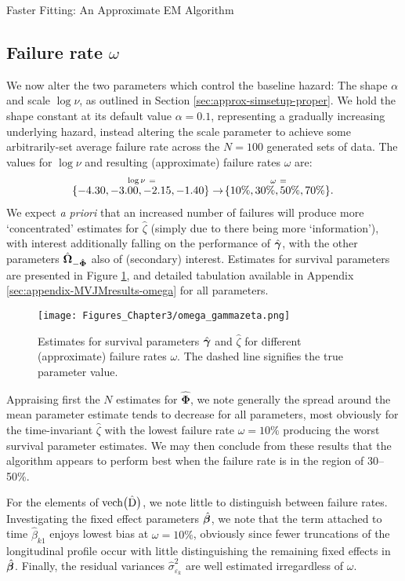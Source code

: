 \begin{chapter}{\label{cha:approx}Faster Fitting: An Approximate EM Algorithm}
  \subsection{Failure rate \texorpdfstring{$\omega$}{omega}}\label{sec:approx-sims-omega}
  We now alter the two parameters which control the baseline hazard: The shape $\alpha$ and scale $\log\nu$, as outlined in Section \ref{sec:approx-simsetup-proper}. We hold the shape constant at its default value $\alpha=0.1$, representing a gradually increasing underlying hazard, instead altering the scale parameter to achieve some arbitrarily-set average failure rate across the $N=100$ generated sets of data. The values for $\log\nu$ and resulting (approximate) failure rates $\omega$ are:
  \begin{align*}
      \overset{\log\nu\ =}{\!\left\{-4.30, -3.00, -2.15, -1.40\right\}}\rightarrow\overset{\omega\ =}{\!\left\{10\%,30\%,50\%,70\%\right\}}.
  \end{align*}
  We expect \textit{a priori} that an increased number of failures will produce more `concentrated' estimates for $\hat{\zeta}$ (simply due to there being more `information'), with interest additionally falling on the performance of $\hat{\bm{\gamma}}$, with the other parameters $\hat{\bm{\Omega}}_{-\hat{\bm{\Phi}}}$ also of (secondary) interest. Estimates for survival parameters are presented in Figure \ref{fig:approx-sims-omega}, and detailed tabulation available in Appendix \ref{sec:appendix-MVJMresults-omega} for all parameters.

  \begin{figure}[t]
      \centering
      \texttt{[image: Figures\_Chapter3/omega\_gammazeta.png]}
      \caption{Estimates for survival parameters $\hat{\bm{\gamma}}$ and $\hat{\zeta}$ for different (approximate) failure rates $\omega$. The dashed line signifies the true parameter value.}
      \label{fig:approx-sims-omega}
  \end{figure}

  Appraising first the $N$ estimates for $\hat{\bm{\Phi}}$, we note generally the spread around the mean parameter estimate tends to decrease for all parameters, most obviously for the time-invariant $\hat{\zeta}$ with the lowest failure rate $\omega=10\%$ producing the worst survival parameter estimates. We may then conclude from these results that the algorithm appears to perform best when the failure rate is in the region of 30--50\%. 
  
  For the elements of $\text{vech}\big(\hat{\mathrm{D}}\big)$, we note little to distinguish between failure rates. Investigating the fixed effect parameters $\hat{\bm{\beta}}$, we note that the term attached to time $\hat{\beta}_{k1}$ enjoys lowest bias at $\omega=10\%$, obviously since fewer truncations of the longitudinal profile occur with little distinguishing the remaining fixed effects in $\hat{\bm{\beta}}$. Finally, the residual variances $\hat{\sigma}^2_{\varepsilon_k}$ are well estimated irregardless of $\omega$.


\end{chapter}
